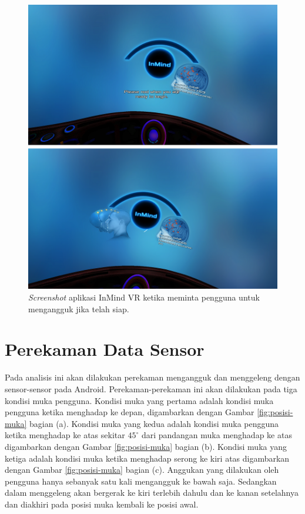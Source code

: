 \begin{figure}[htbp]
\centering
\includegraphics[scale=0.6]{Gambar/screenshot-inmind-nod.png}
\caption{\textit{Screenshot} aplikasi InMind VR ketika meminta pengguna untuk mengangguk jika telah siap.}
\label{fig:screenshot_inmind_nod}
\end{figure}



\section{Perekaman Data Sensor}
\label{sec:perekaman_data_sensor}

Pada analisis ini akan dilakukan perekaman mengangguk dan menggeleng dengan sensor-sensor pada Android. Perekaman-perekaman ini akan dilakukan pada tiga kondisi muka pengguna. Kondisi muka yang pertama adalah kondisi muka pengguna ketika menghadap ke depan, digambarkan dengan Gambar \ref{fig:posisi-muka} bagian (a). Kondisi muka yang kedua adalah kondisi muka pengguna ketika menghadap ke atas sekitar $45^{\circ}$ dari pandangan muka menghadap ke atas digambarkan dengan Gambar \ref{fig:posisi-muka} bagian (b). Kondisi muka yang ketiga adalah kondisi muka ketika menghadap serong ke kiri atas digambarkan dengan Gambar \ref{fig:posisi-muka} bagian (c). Anggukan yang dilakukan oleh pengguna hanya sebanyak satu kali mengangguk ke bawah saja. Sedangkan dalam menggeleng akan bergerak ke kiri terlebih dahulu dan ke kanan setelahnya dan diakhiri pada posisi muka kembali ke posisi awal.

